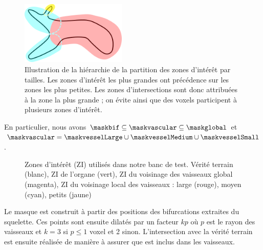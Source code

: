 \begin{figure}[!ht]
  \centering
  \includegraphics[height=3cm]{Images/numibranch.png}
  \caption{Illustration de la hiérarchie de la partition des zones d'intérêt par tailles. Les zones d'intérêt les plus grandes ont précédence sur les zones les plus petites. Les zones d'intersections sont donc attribuées à la zone la plus grande ; on évite ainsi que des voxels participent à plusieurs zones d'intérêt.}
  \label{fig:numibranch}
\end{figure}
En particulier, nous avons $\maskbif \subseteq \maskvascular \subseteq \maskglobal$ et $\maskvascular = \maskvesselLarge \cup \maskvesselMedium \cup \maskvesselSmall$.
\begin{figure}[!ht]
  \centering
  \caption{Zones d'intérêt (ZI) utilisés dans notre banc de test. Vérité terrain (blanc), ZI de l'organe (vert), ZI du voisinage des vaisseaux global (magenta), ZI du voisinage local des vaisseaux : large (rouge), moyen (cyan), petits (jaune)}
  \label{fig:vs_masks}
\end{figure}
Le masque \maskbif est construit à partir des positions des bifurcations extraites du squelette. Ces points sont ensuite dilatés par un facteur $kp$ où $p$ est le rayon des vaisseaux et $k=3$ si $p\leq 1$ voxel et 2 sinon. L'intersection avec la vérité terrain est ensuite réalisée de manière à assurer que \maskbif est inclus dans les vaisseaux.
